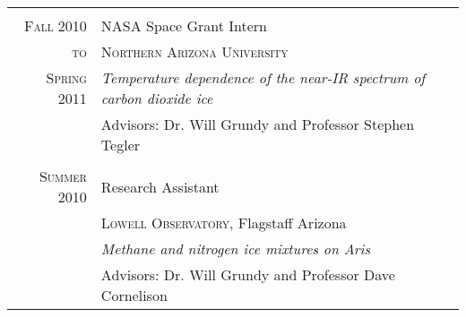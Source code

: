 \documentclass[letterpaper,10pt]{article} %
\begin{document}
\begin{tabularx}{\textwidth}{r|p{11cm}}
\multicolumn{2}{c}{} \\


\textsc{Fall 2010} & NASA Space Grant Intern\\
\textsc{to} & \textsc{Northern Arizona University} \\
\textsc{Spring 2011} &\emph{Temperature dependence of the near-IR spectrum of carbon dioxide ice}\\ 
& Advisors: Dr. Will Grundy and Professor Stephen Tegler \\

\multicolumn{2}{c}{} \\


\textsc{Summer 2010} & Research Assistant \\
& \textsc{Lowell Observatory}, Flagstaff Arizona \\
&\emph{Methane and nitrogen ice mixtures on Aris}\\ 
& Advisors: Dr. Will Grundy and Professor Dave Cornelison \\

\end{tabularx}
\end{document}
